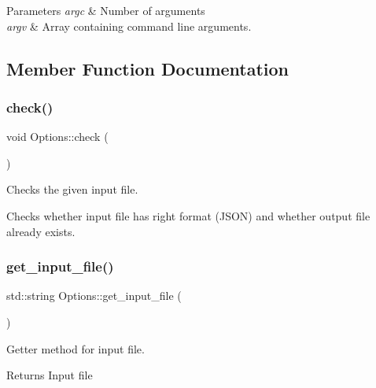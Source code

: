 \begin{DoxyParams}{Parameters}
{\em argc} & Number of arguments \\
\hline
{\em argv} & Array containing command line arguments. \\
\hline
\end{DoxyParams}


\subsection{Member Function Documentation}
\mbox{\label{classOptions_ab8ca4093f5561de9be0405380044c2ea}} 
\subsubsection{\texorpdfstring{check()}{check()}}
{\footnotesize\ttfamily void Options\+::check (\begin{DoxyParamCaption}{ }\end{DoxyParamCaption})}



Checks the given input file. 

Checks whether input file has right format (J\+S\+ON) and whether output file already exists. \mbox{\label{classOptions_aaef1783bad5316e5b4639b032e027425}} 
\subsubsection{\texorpdfstring{get\+\_\+input\+\_\+file()}{get\_input\_file()}}
{\footnotesize\ttfamily std\+::string Options\+::get\+\_\+input\+\_\+file (\begin{DoxyParamCaption}{ }\end{DoxyParamCaption})\hspace{0.3cm}{\ttfamily [inline]}}



Getter method for input file. 

\begin{DoxyReturn}{Returns}
Input file 
\end{DoxyReturn}
\mbox{\label{classOptions_a302c26d01b3b3a87aa3482ec15afa85f}} 
